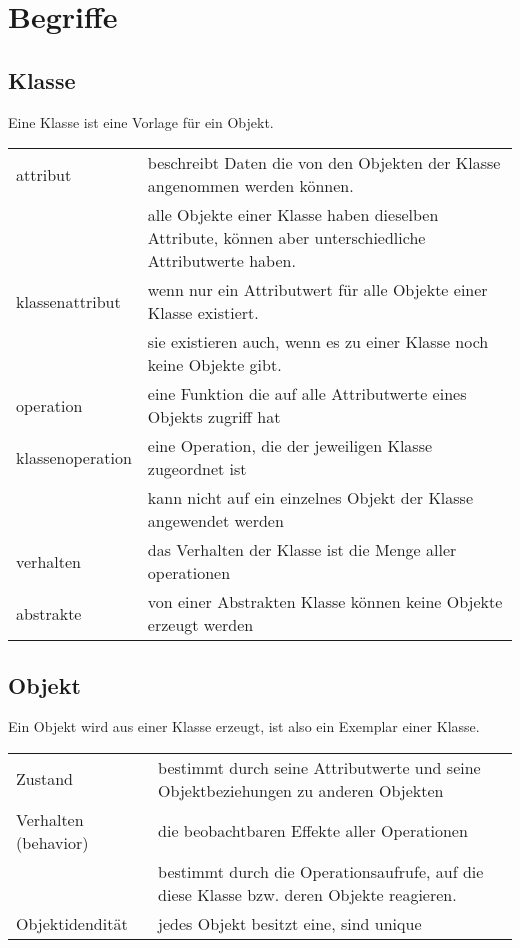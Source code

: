 \section{Begriffe}
\subsection{Klasse}
	Eine Klasse ist eine Vorlage für ein Objekt.\\
	\begin{tabular}{p{3.5cm}p{14.5cm}}
		attribut & beschreibt Daten die von den Objekten der Klasse angenommen werden
		können.\\
		& alle Objekte einer Klasse haben dieselben Attribute, können
		aber unterschiedliche Attributwerte haben.\\
		klassenattribut & wenn nur ein
		Attributwert für alle Objekte einer Klasse existiert.\\
		& sie existieren auch, wenn es zu einer Klasse noch keine Objekte gibt.\\
		operation & eine Funktion die auf alle Attributwerte eines Objekts zugriff
		hat\\
		klassenoperation & eine Operation, die der jeweiligen Klasse zugeordnet ist\\
		& kann nicht auf ein einzelnes Objekt der Klasse angewendet werden\\
		verhalten & das Verhalten der Klasse ist die Menge aller operationen\\
		abstrakte & von einer Abstrakten Klasse können keine Objekte erzeugt werden\\
	\end{tabular}
\subsection{Objekt}
	Ein Objekt wird aus einer Klasse erzeugt, ist also ein Exemplar einer Klasse.\\
	\begin{tabular}{p{3.5cm}p{14.5cm}}
		Zustand & bestimmt durch seine Attributwerte und seine Objektbeziehungen zu
		anderen Objekten\\
		Verhalten (behavior) & die beobachtbaren Effekte aller Operationen\\
		& bestimmt durch die Operationsaufrufe, auf die diese Klasse bzw. deren Objekte
		reagieren.\\
		Objektidendität & jedes Objekt besitzt eine, sind unique\\
	\end{tabular}
